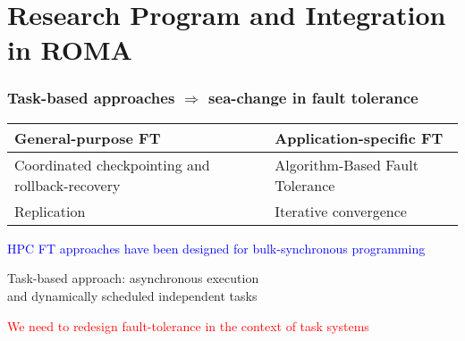 \section{Research Program and Integration in ROMA}

\begin{frame}
  \frametitle{Task-based approaches $\Rightarrow$ sea-change in fault tolerance}

  \begin{center}
    \begin{tabular}{C{.4\linewidth}|C{.4\linewidth}}
      General-purpose FT & Application-specific FT \\\hline
      Coordinated checkpointing and rollback-recovery & Algorithm-Based Fault Tolerance  \\
      Replication                                     & Iterative convergence
    \end{tabular}

    \medskip
    
    \textcolor{blue}{HPC FT approaches have been designed for bulk-synchronous programming}
    
    \bigskip
  
    Task-based approach: asynchronous execution\\
    and dynamically scheduled independent tasks

    \bigskip
  
    \textcolor{red}{We need to redesign fault-tolerance in the context of task systems}
  \end{center}

\end{frame}

